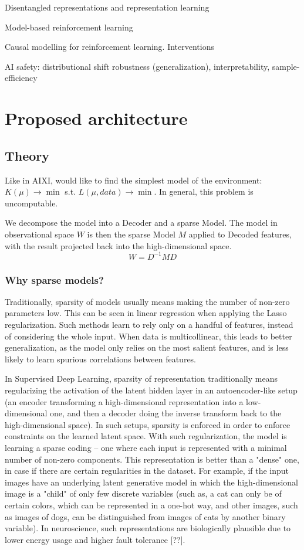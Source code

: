 \documentclass[a4paper,11pt,oneside]{report}
\begin{document}
Disentangled representations and representation learning

Model-based reinforcement learning

Causal modelling for reinforcement learning. Interventions

AI safety: distributional shift robustness (generalization), interpretability, sample-efficiency

\section{Proposed architecture}
\subsection{Theory}
Like in AIXI, would like to find the simplest model of the environment:
$K(\mu)\to\min$ s.t. $L(\mu, data)\to\min$. In general, this problem is uncomputable.

We decompose the model into a Decoder and a sparse Model. The model in observational space $W$ is then the sparse Model $M$ applied to Decoded features, with the result projected back into the high-dimensional space.
$$
W=D^{-1}MD
$$

\subsubsection{Why sparse models?}
Traditionally, sparsity of models usually means making the number of non-zero parameters low. This can be seen in linear regression when applying the Lasso regularization. Such methods learn to rely only on a handful of features, instead of considering the whole input. When data is multicollinear, this leads to better generalization, as the model only relies on the most salient features, and is less likely to learn spurious correlations between features.

In Supervised Deep Learning, sparsity of representation traditionally means regularizing the activation of the latent hidden layer in an autoencoder-like setup (an encoder transforming a high-dimensional representation into a low-dimensional one, and then a decoder doing the inverse transform back to the high-dimensional space). In such setups, sparsity is enforced in order to enforce constraints on the learned latent space. With such regularization, the model is learning a sparse coding -- one where each input is represented with a minimal number of non-zero components.
This representation is better than a "dense" one, in case if there are certain regularities in the dataset.
For example, if the input images have an underlying latent generative model in which the high-dimensional image is a "child" of only few discrete variables (such as, a cat can only be of certain colors, which can be represented in a one-hot way, and other images, such as images of dogs, can be distinguished from images of cats by another binary variable).
In neuroscience, such representations are biologically plausible due to lower energy usage and higher fault tolerance [??].
\end{document}
